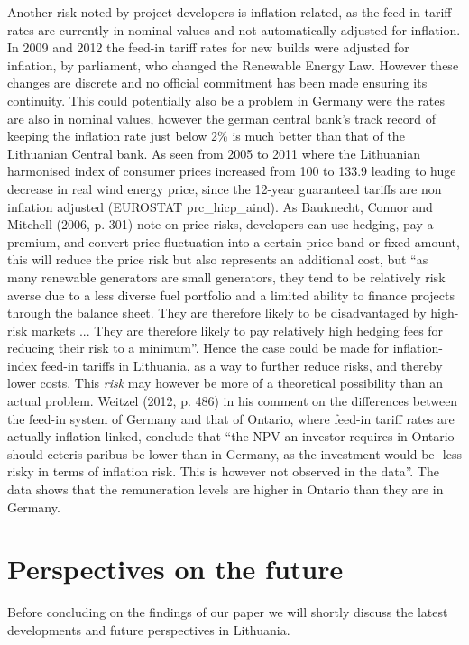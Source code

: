 \documentclass[a4paper, 12pt]{article}
\begin{document}
Another risk noted by project developers is inflation related, as the feed-in tariff rates are currently in nominal values and not automatically adjusted for inflation. In 2009 and 2012 the feed-in tariff rates for new builds were adjusted for inflation, by parliament, who changed the Renewable Energy Law. However these changes are discrete and no official commitment has been made ensuring its continuity. This could potentially also be a problem in Germany were the rates are also in nominal values, however the german central bank’s track record of keeping the inflation rate just below 2\% is much better than that of the Lithuanian Central bank. As seen from 2005 to 2011 where the Lithuanian harmonised index of consumer prices increased from 100 to 133.9 leading to huge decrease in real wind energy price, since the 12-year guaranteed tariffs are non inflation adjusted (EUROSTAT prc\_hicp\_aind). As Bauknecht, Connor and Mitchell (2006, p. 301) note on price risks, developers can use hedging, pay a premium, and convert price fluctuation into a certain price band or fixed amount, this will reduce the price risk but also represents an additional cost, but ``as many renewable generators are small generators, they tend to be relatively risk averse due to a less diverse fuel portfolio and a limited ability to finance projects through the balance sheet. They are therefore likely to be disadvantaged by high-risk markets ... They are therefore likely to pay relatively high hedging fees for reducing their risk to a minimum''. Hence the case could be made for inflation-index feed-in tariffs in Lithuania, as a way to further reduce risks, and thereby lower costs. This \emph{risk} may however be more of a theoretical possibility than an actual problem. Weitzel (2012, p. 486) in his comment on the differences between the feed-in system of Germany and that of Ontario, where feed-in tariff rates are actually inflation-linked, conclude that ``the NPV an investor requires in Ontario should ceteris paribus be lower than in Germany, as the investment would be -less risky in terms of inflation risk. This is however not observed in the data''. The data shows that the remuneration levels are higher in Ontario than they are in Germany.

\section{Perspectives on the future}
Before concluding on the findings of our paper we will shortly discuss the latest developments and future perspectives in Lithuania.
\end{document}
